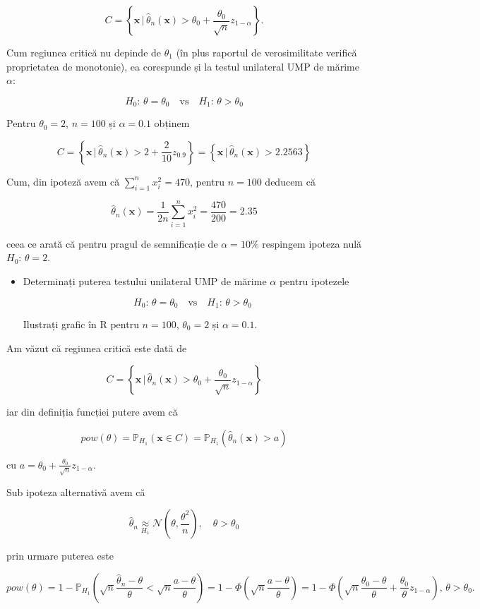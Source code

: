 \documentclass[]{article}
\newenvironment{frshaded*}{%
  \def\FrameCommand{\fboxrule=\FrameRule\fboxsep=\FrameSep \fcolorbox{framecolor}{shadecolor1}}%
  \MakeFramed {\advance\hsize-\width \FrameRestore}}%
{\endMakeFramed}
\newenvironment{rmdblock}[1]
  {\begin{frshaded*}
  \begin{itemize}
  \renewcommand{\labelitemi}{
    \raisebox{-.7\height}[0pt][0pt]{
      {\setkeys{Gin}{width=2em,keepaspectratio}\texttt{[image: images/icons/\#1]}}
    }
  }
  \item
  }
  {
  \end{itemize}
  \end{frshaded*}
  }
\newenvironment{rmdexercise}
  {\begin{rmdblock}{exercise}}
  {\end{rmdblock}}
\begin{document}
\[
  C = \left\{\mathbf{x}\,|\,\hat{\theta}_n(\mathbf{x}) > \theta_0 + \frac{\theta_0}{\sqrt{n}}z_{1-\alpha}\right\}.
\]

Cum regiunea critică nu depinde de \(\theta_1\) (în plus raportul de
verosimilitate verifică proprietatea de monotonie), ea corespunde și la
testul unilateral UMP de mărime \(\alpha\):

\[
  H_0:\, \theta = \theta_0 \quad \text{vs}\quad H_1:\, \theta > \theta_0
\]

Pentru \(\theta_0 = 2\), \(n = 100\) și \(\alpha = 0.1\) obținem

\[
  C = \left\{\mathbf{x}\,|\,\hat{\theta}_n(\mathbf{x}) > 2 + \frac{2}{10}z_{0.9}\right\} = \left\{\mathbf{x}\,|\,\hat{\theta}_n(\mathbf{x}) > 2.2563\right\}
\]

Cum, din ipoteză avem că \(\sum_{i = 1}^{n}x_i^2 = 470\), pentru
\(n = 100\) deducem că

\[
  \hat{\theta}_n(\mathbf{x}) = \frac{1}{2n}\sum_{i = 1}^{n}x_i^2 = \frac{470}{200} = 2.35
\]

ceea ce arată că pentru pragul de semnificație de \(\alpha = 10\%\)
respingem ipoteza nulă \(H_0:\, \theta = 2\).

\begin{rmdexercise}
Determinați puterea testului unilateral UMP de mărime \(\alpha\) pentru
ipotezele

\[
   H_0:\, \theta = \theta_0 \quad \text{vs}\quad H_1:\, \theta > \theta_0
\]

Ilustrați grafic în R pentru \(n = 100\), \(\theta_0 = 2\) și
\(\alpha = 0.1\).
\end{rmdexercise}

Am văzut că regiunea critică este dată de

\[
 C = \left\{\mathbf{x}\,|\,\hat{\theta}_n(\mathbf{x}) > \theta_0 + \frac{\theta_0}{\sqrt{n}}z_{1-\alpha}\right\}
\]

iar din definiția funcției putere avem că

\[
 pow(\theta) = \mathbb{P}_{H_1}(\mathbf{x}\in C) = \mathbb{P}_{H_1}(\hat{\theta}_n(\mathbf{x}) > a)
\]

cu \(a = \theta_0 + \frac{\theta_0}{\sqrt{n}}z_{1-\alpha}\).

Sub ipoteza alternativă avem că

\[
  \hat{\theta}_n \underset{H_1}{\approx} \mathcal{N}\left(\theta, \frac{\theta^2}{n}\right),\quad \theta>\theta_0
\]

prin urmare puterea este

\[
  pow(\theta) = 1 - \mathbb{P}_{H_1}\left(\sqrt{n}\frac{\hat{\theta}_n - \theta}{\theta}<\sqrt{n}\frac{a - \theta}{\theta}\right) = 1 - \Phi\left(\sqrt{n}\frac{a - \theta}{\theta}\right) = 1 - \Phi\left(\sqrt{n}\frac{\theta_0 - \theta}{\theta} + \frac{\theta_0}{\theta}z_{1-\alpha}\right),\, \theta>\theta_0.
\]
\end{document}
